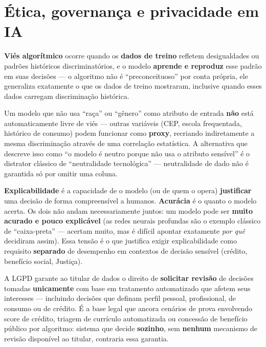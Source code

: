 \section{Ética, governança e privacidade em IA}

\begin{conceito}
\textbf{Viés algorítmico} ocorre quando os \textbf{dados de treino}
refletem desigualdades ou padrões históricos discriminatórios, e o modelo
\textbf{aprende e reproduz} esse padrão em suas decisões --- o algoritmo
não é “preconceituoso” por conta própria, ele generaliza exatamente o que
os dados de treino mostraram, inclusive quando esses dados carregam
discriminação histórica.
\end{conceito}

\begin{cuidado}
Um modelo que não usa “raça” ou “gênero” como atributo de entrada
\textbf{não} está automaticamente livre de viés --- outras variáveis
(CEP, escola frequentada, histórico de consumo) podem funcionar como
\textbf{proxy}, recriando indiretamente a mesma discriminação através de
uma correlação estatística. A alternativa que descreve isso como “o
modelo é neutro porque não usa o atributo sensível” é o distrator clássico
de “neutralidade tecnológica” --- neutralidade de dado não é garantida
só por omitir uma coluna.
\end{cuidado}

\begin{conceito}
\textbf{Explicabilidade} é a capacidade de o modelo (ou de quem o opera)
\textbf{justificar} uma decisão de forma compreensível a humanos.
\textbf{Acurácia} é o quanto o modelo acerta. Os dois não andam
necessariamente juntos: um modelo pode ser \textbf{muito acurado e pouco
explicável} (as redes neurais profundas são o exemplo clássico de
“caixa-preta” --- acertam muito, mas é difícil apontar exatamente
\emph{por quê} decidiram assim). Essa tensão é o que justifica exigir
explicabilidade como requisito \textbf{separado} de desempenho em
contextos de decisão sensível (crédito, benefício social, Justiça).
\end{conceito}

\begin{conceito}
A LGPD garante ao titular de dados o direito de \textbf{solicitar revisão}
de decisões tomadas \textbf{unicamente} com base em tratamento
automatizado que afetem seus interesses --- incluindo decisões que
definam perfil pessoal, profissional, de consumo ou de crédito. É a base
legal que ancora cenários de prova envolvendo score de crédito, triagem de
currículo automatizada ou concessão de benefício público por algoritmo:
sistema que decide \textbf{sozinho}, sem \textbf{nenhum} mecanismo de
revisão disponível ao titular, contraria essa garantia.
\end{conceito}

